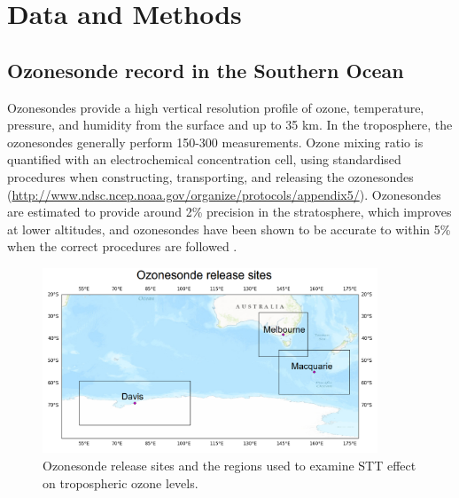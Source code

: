\section{Data and Methods}
  \label{Ozone:DataMethods}

  \subsection{Ozonesonde record in the Southern Ocean}
    \label{Ozone:ozonesondes}
    Ozonesondes provide a high vertical resolution profile of ozone, temperature, pressure, and humidity from the surface and up to 35 km.
    In the troposphere, the ozonesondes generally perform 150-300 measurements.    
    Ozone mixing ratio is quantified with an electrochemical concentration cell, using standardised procedures when constructing, transporting, and releasing the ozonesondes (\url{http://www.ndsc.ncep.noaa.gov/organize/protocols/appendix5/}).
    Ozonesondes are estimated to provide around 2\% precision in the stratosphere, which improves at lower altitudes, and ozonesondes have been shown to be accurate to within 5\% when the correct procedures are followed \citep{Smit2007}.
    
    \begin{figure}
      \includegraphics[width=10cm]{Figures/Ozone/ComparisonRegions.png}
      \caption{Ozonesonde release sites and the regions used to examine STT effect on tropospheric ozone levels.}
      \label{Ozone:fig:ComparisonRegion}
    \end{figure}
    
